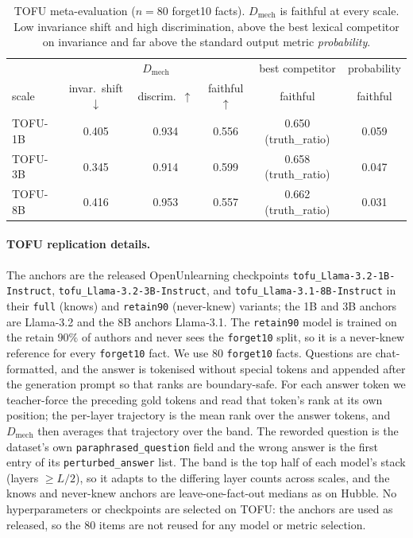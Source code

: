 \begin{table}[t]
  \centering
  \caption[TOFU meta-evaluation (1B/3B/8B)]{TOFU meta-evaluation ($n=80$ forget10 facts). $D_\text{mech}$ is faithful at every scale. Low
  invariance shift and high discrimination, above the best lexical competitor on invariance and far above
  the standard output metric \emph{probability}.}
  \label{tab:tofu}
  \begin{tabular}{lccc|cc}
    \toprule
    & \multicolumn{3}{c|}{$D_\text{mech}$} & best competitor & probability \\
    scale & invar.\ shift $\downarrow$ & discrim.\ $\uparrow$ & faithful $\uparrow$ & faithful & faithful \\
    \midrule
    TOFU-1B & 0.405 & 0.934 & 0.556 & 0.650 (truth\_ratio) & 0.059 \\
    TOFU-3B & 0.345 & 0.914 & 0.599 & 0.658 (truth\_ratio) & 0.047 \\
    TOFU-8B & 0.416 & 0.953 & 0.557 & 0.662 (truth\_ratio) & 0.031 \\
    \bottomrule
  \end{tabular}
\end{table}

\paragraph{TOFU replication details.}
The anchors are the released OpenUnlearning checkpoints \texttt{tofu\_Llama-3.2-1B-Instruct},
\texttt{tofu\_Llama-3.2-3B-Instruct}, and \texttt{tofu\_Llama-3.1-8B-Instruct} in their \texttt{full}
(knows) and \texttt{retain90} (never-knew) variants; the 1B and 3B anchors are Llama-3.2 and the 8B anchors
Llama-3.1. The \texttt{retain90} model is trained on the retain $90\%$ of authors and never sees the
\texttt{forget10} split, so it is a never-knew reference for every \texttt{forget10} fact. We use $80$
\texttt{forget10} facts. Questions are chat-formatted, and the answer is tokenised without special tokens
and appended after the generation prompt so that ranks are boundary-safe. For each answer token we
teacher-force the preceding gold tokens and read that token's rank at its own position; the per-layer
trajectory is the mean rank over the answer tokens, and $D_\text{mech}$ then averages that trajectory over
the band. The reworded question is the dataset's own
\texttt{paraphrased\_question} field and the wrong answer is the first entry of its \texttt{perturbed\_answer}
list. The band is the top half of each model's stack (layers $\geq L/2$), so it adapts to the differing
layer counts across scales, and the knows and never-knew anchors are leave-one-fact-out medians as on
Hubble. No hyperparameters or checkpoints are selected on TOFU: the anchors are used as released, so the
$80$ items are not reused for any model or metric selection.


